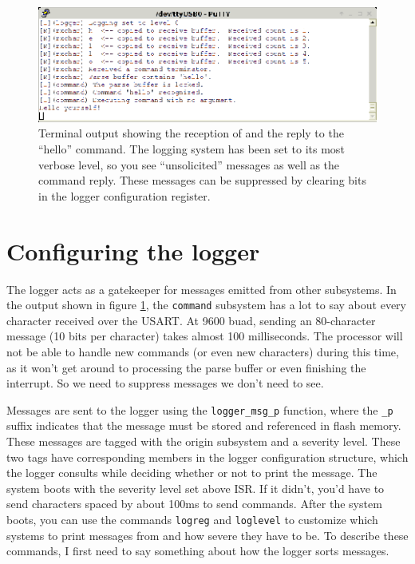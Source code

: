 \begin{figure}[ht]
    \begin{center}
        \includegraphics[clip,scale=1.5]{pngs/hellotrace.eps}
        \caption{Terminal output showing the reception of and the reply to the ``hello'' command.  The logging system has been set to its most verbose level, so you see ``unsolicited'' messages as well as the command reply.  These messages can be suppressed by clearing bits in the logger configuration register.\label{fig:hellotrace}}
    \end{center}
\end{figure}

\clearpage{}
\section{Configuring the logger}
The logger acts as a gatekeeper for messages emitted from other subsystems.  In the output shown in figure \ref{fig:hellotrace}, the \texttt{command} subsystem has a lot to say about every character received over the USART.  At 9600 buad, sending an 80-character message (10 bits per character) takes almost 100 milliseconds.  The processor will not be able to handle new commands (or even new characters) during this time, as it won't get around to processing the parse buffer or even finishing the interrupt.  So we need to suppress messages we don't need to see.  

Messages are sent to the logger using the \texttt{logger\_msg\_p} function, where the \texttt{\_p} suffix indicates that the message must be stored and referenced in flash memory.  These messages are tagged with the origin subsystem and a severity level.  These two tags have corresponding members in the logger configuration structure, which the logger consults while deciding whether or not to print the message.  The system boots with the severity level set above ISR.  If it didn't, you'd have to send characters spaced by about 100ms to send commands.  After the system boots, you can use the commands \texttt{logreg} and \texttt{loglevel} to customize which systems to print messages from and how severe they have to be.  To describe these commands, I first need to say something about how the logger sorts messages.


